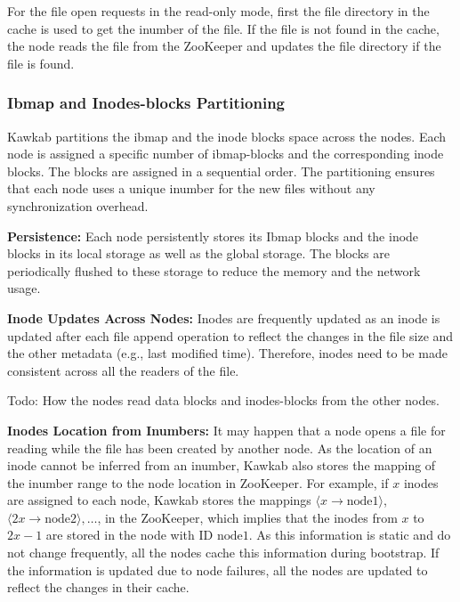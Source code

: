 \documentclass[]{article}
\newcommand{\subtopic}[1]{\vspace{1.5pt} \noindent \textbf{#1}}
\newcommand{\hl}[1]{\textcolor{hlcolor}{#1}}
\begin{document}
For the file open requests in the read-only mode, first the file directory in
the cache is used to get the inumber of the file. If the file is not found in
the cache, the node reads the file from the ZooKeeper and updates the file
directory if the file is found.



\subsubsection{Ibmap and Inodes-blocks Partitioning} Kawkab partitions the ibmap
and the inode blocks space across the nodes. Each node is assigned a specific
number of ibmap-blocks and the corresponding inode blocks.
The blocks are assigned in a sequential order. The partitioning ensures that
each node uses a unique inumber for the new files without any synchronization
overhead.

\subtopic{Persistence:} Each node persistently stores its Ibmap blocks and the
inode blocks in its local storage as well as the global storage. The blocks are
periodically flushed to these storage to reduce the memory and the network usage.

\subtopic{Inode Updates Across Nodes:} Inodes are frequently updated as an inode is
updated after each file append operation to reflect the changes in the file
size and the other metadata (e.g., last modified time).  Therefore, inodes need
to be made consistent across all the readers of the file.

\hl{Todo: How the nodes read data blocks and inodes-blocks from the other nodes.}



\subtopic{Inodes Location from Inumbers:} It may happen that a node opens a
file for reading while the file has been created by another node. As the
location of an inode cannot be inferred from an inumber, Kawkab also stores the
mapping of the inumber range to the node location in ZooKeeper.  For example,
if $x$ inodes are assigned to each node, Kawkab stores the mappings $\langle x
\to \mathrm{node1} \rangle$, $\langle 2x \to \mathrm{node2} \rangle, \ldots$,
in the ZooKeeper, which implies that the inodes from $x$ to $2x-1$ are stored
in the node with ID $\mathrm{node1}$. As this information is static and do not
change frequently, all the nodes cache this information during bootstrap. If
the information is updated due to node failures, all the nodes are updated to
reflect the changes in their cache.
\end{document}
